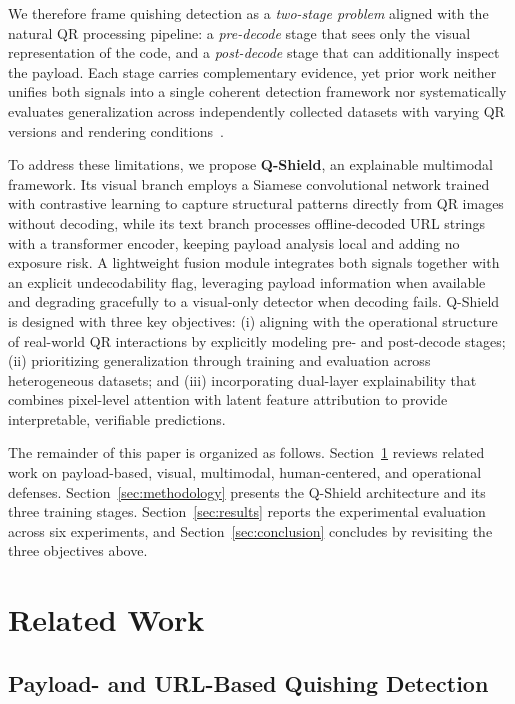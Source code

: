 \documentclass[conference]{IEEEtran}
\begin{document}
We therefore frame quishing detection as a \textit{two-stage problem} aligned with the natural QR processing pipeline: a \textit{pre-decode} stage that sees only the visual representation of the code, and a \textit{post-decode} stage that can additionally inspect the payload. Each stage carries complementary evidence, yet prior work neither unifies both signals into a single coherent detection framework nor systematically evaluates generalization across independently collected datasets with varying QR versions and rendering conditions~\cite{nejati2026cic, wahid2026alfa}.

To address these limitations, we propose \textbf{Q-Shield}, an explainable multimodal framework. Its visual branch employs a Siamese convolutional network trained with contrastive learning to capture structural patterns directly from QR images without decoding, while its text branch processes offline-decoded URL strings with a transformer encoder, keeping payload analysis local and adding no exposure risk. A lightweight fusion module integrates both signals together with an explicit undecodability flag, leveraging payload information when available and degrading gracefully to a visual-only detector when decoding fails. Q-Shield is designed with three key objectives: (i) aligning with the operational structure of real-world QR interactions by explicitly modeling pre- and post-decode stages; (ii) prioritizing generalization through training and evaluation across heterogeneous datasets; and (iii) incorporating dual-layer explainability that combines pixel-level attention with latent feature attribution to provide interpretable, verifiable predictions.

The remainder of this paper is organized as follows. Section~\ref{sec:related} reviews related work on payload-based, visual, multimodal, human-centered, and operational defenses. Section~\ref{sec:methodology} presents the Q-Shield architecture and its three training stages. Section~\ref{sec:results} reports the experimental evaluation across six experiments, and Section~\ref{sec:conclusion} concludes by revisiting the three objectives above.

\section{Related Work}
\label{sec:related}

\subsection{Payload- and URL-Based Quishing Detection}
\end{document}
